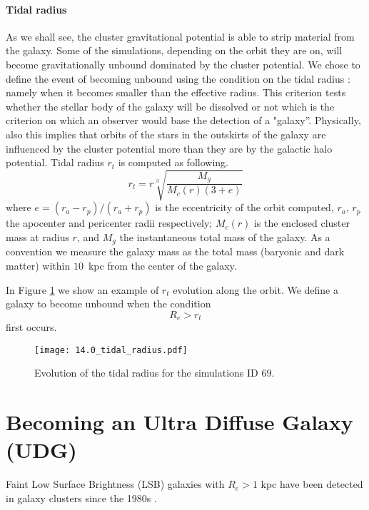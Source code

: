 \paragraph*{Tidal radius}
As we shall see, the cluster gravitational potential is able to strip material from the galaxy. Some of the simulations, depending on the orbit they are on, will become gravitationally unbound dominated by the cluster potential.
We chose to define the event of becoming unbound using the condition on the tidal radius \cite{King1962}: namely when it becomes smaller than the effective radius.
This criterion tests whether the stellar body of the galaxy will be dissolved or not which is the criterion on which an observer would base the detection of a "galaxy''.
Physically, also this implies that orbits of the stars in the outskirts of the galaxy are influenced by the cluster potential more than they are by the galactic halo potential. 
Tidal radius $r_t$ is computed as following.
\begin{equation}
r_t = r \sqrt[3]{\frac{M_g}{M_c(r) (3+e)}}
\label{eq:tidal_radius}
\end{equation}
where $e = (r_a - r_p) / (r_a + r_p)$ is the eccentricity of the orbit computed, $r_a$, $r_p$ the apocenter and pericenter radii respectively; $M_c(r)$ is the enclosed cluster mass at radius $r$, and $M_g$ the instantaneous total mass of the galaxy.
As a convention we measure the galaxy mass as the total mass (baryonic and dark matter) within $10$~kpc from the center of the galaxy.

In Figure \ref{fig:tidal_radius} we show an example of $r_t$ evolution along the orbit.
We define a galaxy to become unbound when the condition 
\begin{equation}
    R_e > r_t
\label{eq:tidal_radius_condition}
\end{equation}
first occurs.
\begin{figure}
\centering
\texttt{[image: 14.0\_tidal\_radius.pdf]}
\caption{Evolution of the tidal radius for the simulations ID 69.}
\label{fig:tidal_radius}
\end{figure}

\section{Becoming an Ultra Diffuse Galaxy (UDG)}
\label{sec:UDG}

Faint Low Surface Brightness (LSB) galaxies with $R_e > 1$ kpc have been detected in galaxy clusters since the 1980s \citep[e.g.][]{Sandage1984}.

